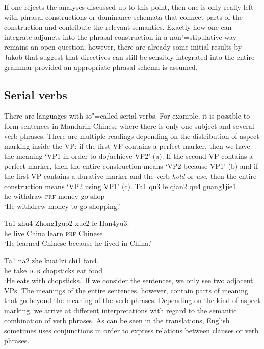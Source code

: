 \begin{exe}
\begin{xlist}[iv.]
\begin{exe}
\begin{xlist}[iv.]
If one rejects the analyses discussed up to this point, then one is only really left with phrasal constructions or dominance schemata that connect parts
of the construction and contribute the relevant semantics. Exactly how one can integrate adjuncts into the phrasal construction in a non"=stipulative way
remains an open question, however, there are already some initial results by Jakob \citet{Mache2010a} that suggest that directives can still be sensibly integrated into
the entire grammar provided an appropriate phrasal schema is assumed.

\subsection{Serial verbs}

There are languages with so"=called serial verbs. For example, it is possible to form sentences in Mandarin Chinese where there is only one subject
and several verb phrases. There are multiple readings depending on the distribution of aspect marking inside the VP: if the first VP contains a perfect marker, then we have
the meaning `VP1 in order to do/achieve VP2' (a). If the second VP contains a perfect marker, then the entire construction means `VP2 because VP1' (b) and if the
first VP contains a durative marker and the verb \emph{hold} or \emph{use}, then the entire construction means `VP2 using VP1' (c). 
\eal
\ex
\gll Ta1 qu3 le qian2 qu4 guang1jie1. \\
     he withdraw \textsc{prf} money go shop \\
\glt `He withdrew money to go shopping.'

\ex
\gll Ta1 zhu4 Zhong1guo2 xue2 le Han4yu3. \\
     he  live China learn \textsc{prf} Chinese \\
\glt `He learned Chinese because he lived in China.'

\ex
\gll Ta1 na2 zhe kuai4zi chi1 fan4.\\
     he  take \textsc{dur} chopsticks eat food \\
\glt `He eats with chopsticks.'
\zl
If we consider the sentences, we only see two adjacent VPs. The meanings of the entire sentences, however, contain parts of meaning that go beyond the meaning
of the verb phrases. Depending on the kind of aspect marking, we arrive at different interpretations with regard to the semantic combination of verb phrases.
As can be seen in the translations, English sometimes uses conjunctions in order to express relations between clauses or verb phrases.


\end{xlist}
\end{exe}
\end{xlist}
\end{exe}
